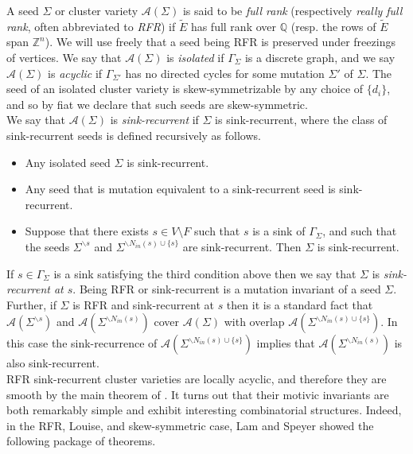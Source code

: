 \documentclass[11pt]{amsart}
\theoremstyle{definition}
\theoremstyle{remark}
\numberwithin{equation}{section}
\begin{document}
A seed $\Sigma$ or cluster variety $\mathcal{A}(\Sigma)$ is said to be \textit{full rank} (respectively \textit{really full rank}, often abbreviated to \textit{RFR}) if $\tilde{E}$ has full rank over $\mathbb{Q}$ (resp. the rows of $\tilde{E}$ span $\mathbb{Z}^n$). We will use freely that a seed being RFR is preserved under freezings of vertices. We say that $\mathcal{A}(\Sigma)$ is \textit{isolated} if $\Gamma_\Sigma$ is a discrete graph, and we say $\mathcal{A}(\Sigma)$ is \textit{acyclic} if $\Gamma_{\Sigma'}$ has no directed cycles for some mutation $\Sigma'$ of $\Sigma$. The seed of an isolated cluster variety is skew-symmetrizable by any choice of $\{d_i\}$, and so by fiat we declare that such seeds are skew-symmetric.\\

We say that $\mathcal{A}(\Sigma)$ is \textit{sink-recurrent} if $\Sigma$ is sink-recurrent, where the class of sink-recurrent seeds is defined recursively as follows.

\begin{itemize}
    \item Any isolated seed $\Sigma$ is sink-recurrent.
    \item Any seed that is mutation equivalent to a sink-recurrent seed is sink-recurrent.
    \item Suppose that there exists $s \in V \setminus F$ such that $s$ is a sink of $\Gamma_\Sigma$, and such that the seeds $\Sigma^{\backslash s}$ and $\Sigma^{\backslash N_{in}(s) \cup \{s\}}$ are sink-recurrent. Then $\Sigma$ is sink-recurrent.
\end{itemize}

If $s \in \Gamma_\Sigma$ is a sink satisfying the third condition above then we say that $\Sigma$ is \textit{sink-recurrent at $s$}. Being RFR or sink-recurrent is a mutation invariant of a seed $\Sigma$. Further, if $\Sigma$ is RFR and sink-recurrent at $s$ then it is a standard fact that $\mathcal{A}(\Sigma^{\backslash s})$ and $\mathcal{A}(\Sigma^{\backslash N_{in}(s)})$ cover $\mathcal{A}(\Sigma)$ with overlap $\mathcal{A}(\Sigma^{\backslash N_{in}(s) \cup \{s\}})$. In this case the sink-recurrence of $\mathcal{A}(\Sigma^{\backslash N_{in}(s) \cup \{s\}})$ implies that $\mathcal{A}(\Sigma^{\backslash N_{in}(s)})$ is also sink-recurrent.\\

RFR sink-recurrent cluster varieties are locally acyclic, and therefore they are smooth by the main theorem of \cite{muller2013locally}. It turns out that their motivic invariants are both remarkably simple and exhibit interesting combinatorial structures. Indeed, in the RFR, Louise, and skew-symmetric case, Lam and Speyer \cite{lam2022cohomology} showed the following package of theorems.
\end{document}
